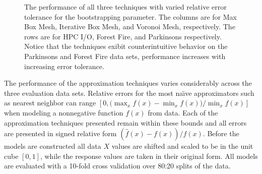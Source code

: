 \begin{figure}[htb]
  \caption{The performance of all three techniques with varied relative error tolerance for the bootstrapping parameter. The columns are for Max Box Mesh, Iterative Box Mesh, and Voronoi Mesh, respectively. The rows are for HPC I/O, Forest Fire, and Parkinsons respectively. Notice that the techniques exibit counterintuitive behavior on the Parkinsons and Forest Fire data sets, performance increases with increasing error tolerance.}
  \label{fig_all_performance}
\end{figure}

The performance of the approximation techniques varies considerably across the three evaluation data sets. Relative errors for the most na\"{\i}ve approximators such as nearest neighbor can range $\displaystyle [0, \big(\max_x f(x) - \min_x f(x)\big) / \min_x f(x) ]$ when modeling a nonnegative function $f(x)$ from data. Each of the approximation techniques presented remain within these bounds and all errors are presented in signed relative form $(\hat f(x) - f(x)) / f(x)$. Before the models are constructed all data $X$ values are shifted and scaled to be in the unit cube $[0,1]$, while the response values are taken in their original form. All models are evaluated with a 10-fold cross validation over 80:20 splits of the data.

